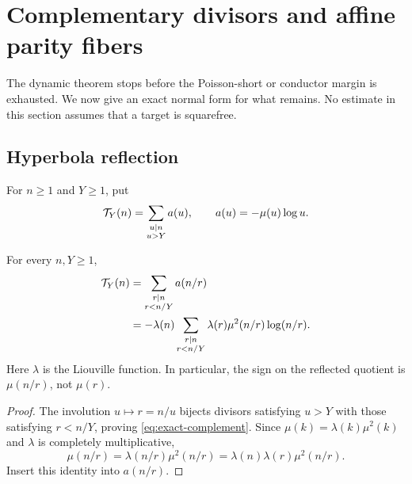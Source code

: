 \section{Complementary divisors and affine parity fibers}
\label{sec:complement-fibers}

The dynamic theorem stops before the Poisson-short or conductor margin
is exhausted.  We now give an exact normal form for what remains.  No
estimate in this section assumes that a target is squarefree.

\subsection{Hyperbola reflection}

For \(n\ge1\) and \(Y\ge1\), put
\begin{equation}
 \mathcal T_Y(n)=\sum_{\substack{u\mid n\\u>Y}}a(u),
 \qquad a(u)=-\mu(u)\log u.
 \label{eq:TY}
\end{equation}

\begin{proposition}
\label{prop:complement-cocycle}
For every \(n,Y\ge1\),
\begin{align}
 \mathcal T_Y(n)
 &=\sum_{\substack{r\mid n\\r<n/Y}}a(n/r)
 \label{eq:exact-complement}\\
 &=-\lambda(n)
 \sum_{\substack{r\mid n\\r<n/Y}}
 \lambda(r)\mu^2(n/r)\log(n/r).
 \label{eq:exact-Liouville-cocycle}
\end{align}
Here \(\lambda\) is the Liouville function.  In particular, the sign on
the reflected quotient is \(\mu(n/r)\), not \(\mu(r)\).
\end{proposition}

\begin{proof}
The involution \(u\mapsto r=n/u\) bijects divisors satisfying \(u>Y\)
with those satisfying \(r<n/Y\), proving
\eqref{eq:exact-complement}.  Since
\(\mu(k)=\lambda(k)\mu^2(k)\) and \(\lambda\) is completely
multiplicative,
\[
 \mu(n/r)=\lambda(n/r)\mu^2(n/r)
 =\lambda(n)\lambda(r)\mu^2(n/r).
\]
Insert this identity into \(a(n/r)\).
\end{proof}

